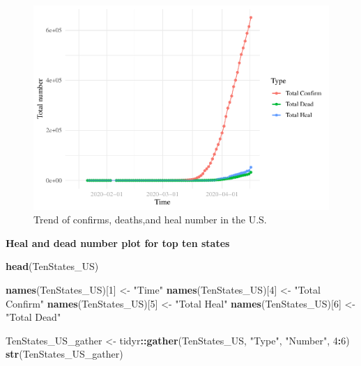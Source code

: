 \documentclass[12pt,]{article}
\newenvironment{Shaded}{\begin{snugshade}}{\end{snugshade}}
\newcommand{\DecValTok}[1]{\textcolor[rgb]{0.00,0.00,0.81}{#1}}
\newcommand{\KeywordTok}[1]{\textcolor[rgb]{0.13,0.29,0.53}{\textbf{#1}}}
\newcommand{\NormalTok}[1]{#1}
\newcommand{\OperatorTok}[1]{\textcolor[rgb]{0.81,0.36,0.00}{\textbf{#1}}}
\newcommand{\StringTok}[1]{\textcolor[rgb]{0.31,0.60,0.02}{#1}}
\begin{document}
\begin{figure}
\centering
\includegraphics{Feng_ENV872_Project_files/figure-latex/US_Number_Trend.plot-1.pdf}
\caption{Trend of confirms, deaths,and heal number in the U.S.}
\end{figure}

\textbf{Heal and dead number plot for top ten states}

\begin{Shaded}
\begin{Highlighting}[]
\KeywordTok{head}\NormalTok{(TenStates_US)}

\KeywordTok{names}\NormalTok{(TenStates_US)[}\DecValTok{1}\NormalTok{] <-}\StringTok{ "Time"}
\KeywordTok{names}\NormalTok{(TenStates_US)[}\DecValTok{4}\NormalTok{] <-}\StringTok{ "Total Confirm"}
\KeywordTok{names}\NormalTok{(TenStates_US)[}\DecValTok{5}\NormalTok{] <-}\StringTok{ "Total Heal"}
\KeywordTok{names}\NormalTok{(TenStates_US)[}\DecValTok{6}\NormalTok{] <-}\StringTok{ "Total Dead"}

\NormalTok{TenStates_US_gather <-}\StringTok{ }\NormalTok{tidyr}\OperatorTok{::}\KeywordTok{gather}\NormalTok{(TenStates_US, }\StringTok{"Type"}\NormalTok{, }\StringTok{"Number"}\NormalTok{, }\DecValTok{4}\OperatorTok{:}\DecValTok{6}\NormalTok{)}
\KeywordTok{str}\NormalTok{(TenStates_US_gather)}
\end{Highlighting}
\end{Shaded}
\end{document}

